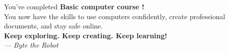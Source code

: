 \vspace{20pt}
\begin{center}
\begin{tcolorbox}[
  enhanced, colback=FunYellow!15, colframe=FunYellow!80!black, arc=12pt,
  width=10cm, halign=center,
  fonttitle=\Large\bfseries\sffamily, title={\faStar\ Congratulations!},
  coltitle=white, boxed title style={colback=FunYellow!80!black}
]
\large\sffamily
You've completed \textbf{Basic computer course !} \\[8pt]
You now have the skills to use computers confidently, create professional documents, and stay safe online.\\[8pt]
\textbf{Keep exploring. Keep creating. Keep learning!}\\[6pt]
\normalsize\itshape --- Byte the Robot \faRobot
\end{tcolorbox}
\end{center}
